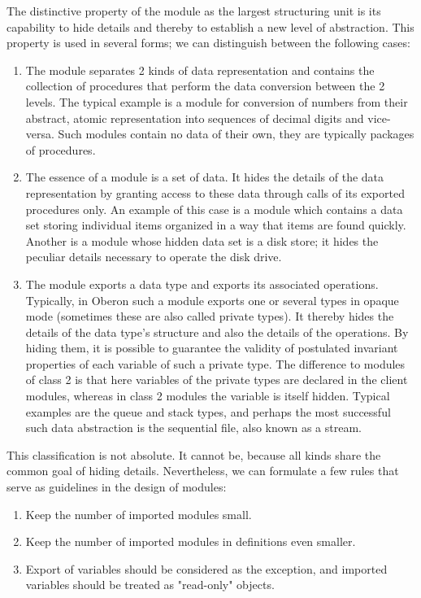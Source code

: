 The distinctive property of the module as the largest structuring unit is its capability to hide details
and thereby to establish a new level of abstraction. This property is used in several forms; we can
distinguish between the following cases:
\begin{enumerate}
  \item The module separates 2 kinds of data representation and contains the collection of procedures
that perform the data conversion between the 2 levels. The typical example is a module for
conversion of numbers from their abstract, atomic representation into sequences of decimal digits
and vice-versa. Such modules contain no data of their own, they are typically packages of
procedures.

  \item The essence of a module is a set of data. It hides the details of the data representation by
granting access to these data through calls of its exported procedures only. An example of this
case is a module which contains a data set storing individual items organized in a way that items
are found quickly. Another is a module whose hidden data set is a disk store; it hides the peculiar
details necessary to operate the disk drive.

  \item The module exports a data type and exports its associated operations. Typically, in Oberon such
a module exports one or several types in opaque mode (sometimes these are also called private
types). It thereby hides the details of the data type's structure and also the details of the
operations. By hiding them, it is possible to guarantee the validity of postulated invariant
properties of each variable of such a private type. The difference to modules of class 2 is that
here variables of the private types are declared in the client modules, whereas in class 2 modules
the variable is itself hidden. Typical examples are the queue and stack types, and perhaps the
most successful such data abstraction is the sequential file, also known as a stream.
\end{enumerate}
This classification is not absolute. It cannot be, because all kinds share the common goal of hiding
details. Nevertheless, we can formulate a few rules that serve as guidelines in the design of modules:
\begin{enumerate}
  \item Keep the number of imported modules small.
  \item Keep the number of imported modules in definitions even smaller.
  \item Export of variables should be considered as the exception, and imported variables should be
    treated as "read-only" objects.
\end{enumerate}

